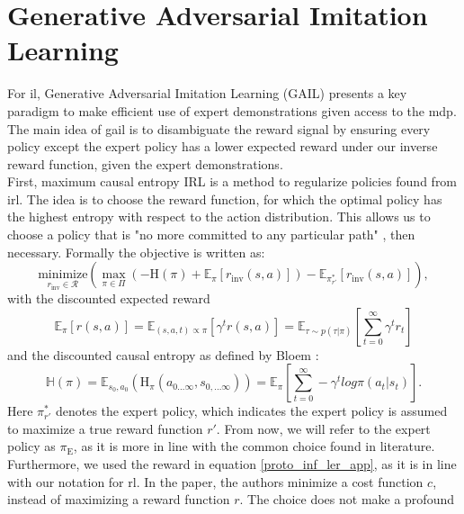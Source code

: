 \chapter{Generative Adversarial Imitation Learning}
\label{app:GAIL}
For \ac{il}, Generative Adversarial Imitation Learning (GAIL) 
\cite{ho2016generative} presents a key paradigm to make efficient use of expert demonstrations given access to the \ac{mdp}. 
The main idea of \ac{gail} is to disambiguate the reward signal 
by ensuring every policy except the expert policy has a lower expected reward under our inverse reward function, given the expert 
demonstrations.\\ 
First, 
maximum causal entropy IRL \cite{10.5555/3104322.3104481} is a method to regularize policies found from \ac{irl}. The idea is to choose the reward function, for 
which the optimal policy has the highest entropy with respect to the action distribution. This allows us to choose a policy that is "no more committed to any 
particular path" \cite[p.2]{10.5555/3104322.3104481}, then necessary. Formally the objective is written as:
\begin{equation*}
    \label{proto_inf_ler_app}
    \underset{r_{\text{inv}} \in \mathcal{R}}{\text{minimize}} \left( \max_{\pi \in \Pi} \left( - \text{H}(\pi) + \mathbb{E}_{\pi}[r_{\text{inv}}(s, a)] \right) - \mathbb{E}_{\pi_{r'}^*}[r_{\text{inv}}(s,a)] \right),
\end{equation*}
with the discounted expected reward
\begin{equation*}
    \mathbb{E}_{\pi}[r(s, a)] =
    \mathbb{E}_{(s,a,t) \propto \pi}[\gamma^t r(s,a)] = 
    \mathbb{E}_{\tau \sim p(\tau | \pi)} \left[ \sum_{t=0}^\infty \gamma^t r_t \right]
\end{equation*}
and the discounted causal entropy as defined by Bloem \etAl \cite{InfCausalEnt}:
\begin{equation*}
    \mathbb{H}(\pi) = \mathbb{E}_{s_0, a_0} \left(\text{H}_{\pi}(a_{0...\infty}, s_{0,...\infty})\right) = \mathbb{E}_{\pi}\left[\sum_{t=0}^\infty -\gamma^t log \pi(a_t|s_t)\right].
\end{equation*}
Here $\pi_{r'}^*$ denotes the expert policy, which indicates the expert policy is assumed to maximize a true 
reward function ${r'}$. From now, we will refer to the expert policy as $\pi_{\text{E}}$, as it is more in line with the common choice found in 
literature. Furthermore, we used the reward in equation  \ref{proto_inf_ler_app}, as it is in line with our notation for \ac{rl}. In the paper, 
the authors minimize a cost function $c$, instead of maximizing a reward function $r$. The choice does not make a profound 

